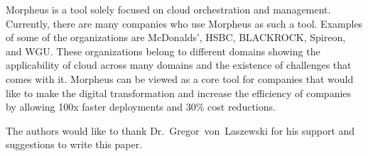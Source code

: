 Morpheus is a tool solely focused on cloud orchestration and management.
Currently, there are many companies who use Morpheus as such a tool. Examples
of some of the organizations are McDonalds', HSBC, BLACKROCK, Spireon, and WGU.
These organizations belong to different domains showing the applicability of
cloud across many domains and the existence of challenges that comes with it.
Morpheus can be viewed as a core tool for companies that would like to make the
digital transformation and increase the efficiency of companies by allowing
100x faster deployments and 30\% cost reductions.

\begin{acks}
	
	The authors would like to thank Dr.~Gregor~von~Laszewski for his support and
	suggestions to write this paper.
	
\end{acks}

 


